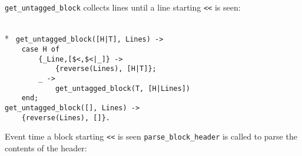 \verb+get_untagged_block+ collects lines until a line starting
\verb+<<+ is seen:
 
\begin{flushleft}
\label{parsing_7_13}
\\*
\tt
\noindent{}%
\verb&get_untagged_block([H|T], Lines) ->&\\
\noindent{}%
\verb&    case H of&\\
\noindent{}%
\verb&        {_Line,[$<,$<|_]} ->&\\
\noindent{}%
\verb&            {reverse(Lines), [H|T]};&\\
\noindent{}%
\verb&        _ ->&\\
\noindent{}%
\verb&            get_untagged_block(T, [H|Lines])&\\
\noindent{}%
\verb&    end;&\\
\noindent{}%
\verb&get_untagged_block([], Lines) ->&\\
\noindent{}%
\verb&    {reverse(Lines), []}.&\\
\end{flushleft}

Event time a block starting \verb+<<+ is seen \verb+parse_block_header+ is
called to parse the contents of the header:

